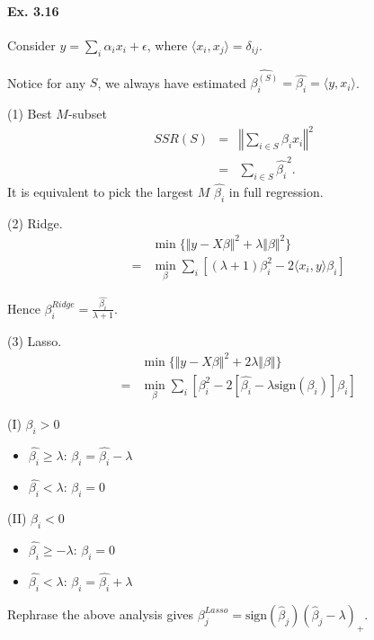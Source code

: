 \paragraph*{Ex. 3.16}
Consider $y = \sum_{i} \alpha_i x_i + \epsilon$, where $\langle x_{i}, x_{j}\rangle=\delta_{ij}.$

Notice for any $S$, we always have estimated $\widehat{\beta_{i}^{(S)}} =\widehat{\beta_i}=\langle y, x_i\rangle$.

(1) Best $M$-subset
\begin{eqnarray*}
    SSR(S)&=&\left\Vert \sum_{i\in S}\widehat{\beta_{i}}x_{i}\right\Vert^2\\
    &=&\sum_{i\in S}\widehat{\beta_{i}}^2.
\end{eqnarray*}
It is equivalent to pick the largest $M$ $\widehat{\beta_{i}}$ in full regression.

(2) Ridge.
\begin{eqnarray*}
    &&\min\{\Vert y-X\beta\Vert^2 + \lambda \Vert \beta\Vert^2\}\\
    &=&\min_{\beta}\sum_{i}[(\lambda + 1)\beta_{i}^2 - 2\langle x_{i}, y\rangle\beta_{i}]
\end{eqnarray*}

Hence $\beta_{i}^{Ridge}=\frac{\widehat{\beta_i}}{\lambda + 1}.$


(3) Lasso.
\begin{eqnarray*}
    &&\min\{\Vert y-X\beta\Vert^2 + 2 \lambda \Vert \beta\Vert\}\\
    &=&\min_{\beta}\sum_{i}\left[\beta_{i}^2 - 2[\hat{\beta_{i}} - \lambda \mbox{sign}(\beta_i)]\beta_{i}\right]
\end{eqnarray*}

(I) $\beta_{i} > 0$
\begin{itemize}
    \item $\hat{\beta_{i}} \geq \lambda$: $\beta_{i} = \hat{\beta_{i}} - \lambda$
    \item $\hat{\beta_{i}} < \lambda$: $\beta_{i} = 0$
\end{itemize}

(II) $\beta_{i} < 0$
\begin{itemize}
    \item $\hat{\beta_{i}} \geq -\lambda$: $\beta_{i} = 0$
    \item $\hat{\beta_{i}} < \lambda$: $\beta_{i} = \hat{\beta_{i}} + \lambda$
\end{itemize}
Rephrase the above analysis gives $\beta^{Lasso}_{j} = \mbox{sign}(\hat{\beta}_{j})(\hat{\beta}_{j} - \lambda)_+$.

